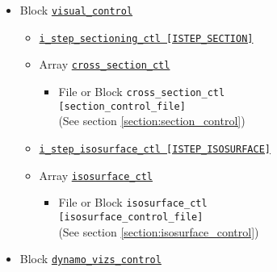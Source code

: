 \begin{itemize}
\begin{itemize}
\begin{itemize}
\begin{itemize}
						{\tt pick\_circle\_coord\_ctl   [Coordinate]}
						\label{href_i:pick_circle_coord_ctl}
				\item \hyperref[href_t:nphi_mid_eq_ctl]
						{\tt nphi\_mid\_eq\_ctl   [Nphi\_mid\_equator]}
						\label{href_i:nphi_mid_eq_ctl}
				\item \hyperref[href_t:pick_cylindrical_radius_ctl]
						{\tt pick\_cylindrical\_radius\_ctl   [S]}
						\label{href_i:pick_cylindrical_radius_ctl}
				\item \hyperref[href_t:pick_vertical_position_ctl]
						{\tt pick\_vertical\_position\_ctl    [Z]}
						\label{href_i:pick_vertical_position_ctl}
			\end{itemize}
		\end{itemize}
	\end{itemize}
%
%
\item Block \hyperref[href_t:visual_control]{\tt visual\_control}
    \begin{itemize} \label{href_i:visual_control}
	\item \hyperref[href_t:i_step_sectioning_ctl]
        {\tt i\_step\_sectioning\_ctl  [ISTEP\_SECTION]}
    \item Array \hyperref[href_t:cross_section_ctl]{\tt cross\_section\_ctl}
		\begin{itemize}
        \item File or Block {\tt cross\_section\_ctl} \\
                            {\tt [section\_control\_file]} \\
								(See section \ref{section:section_control})
		\end{itemize}
%
    \item \hyperref[href_t:i_step_isosurface_ctl]
		{\tt i\_step\_isosurface\_ctl  [ISTEP\_ISOSURFACE]}
    \item Array \hyperref[href_t:isosurface_ctl]{\tt isosurface\_ctl}
		\begin{itemize}
		\item File or Block {\tt isosurface\_ctl} \\
                            {\tt [isosurface\_control\_file]} \\
								(See section \ref{section:isosurface_control})
		\end{itemize}
    \end{itemize}
%
\item Block \hyperref[href_t:dynamo_vizs_control]{\tt dynamo\_vizs\_control}
	\begin{itemize} \label{href_i:dynamo_vizs_control}

\end{itemize}
\end{itemize}
